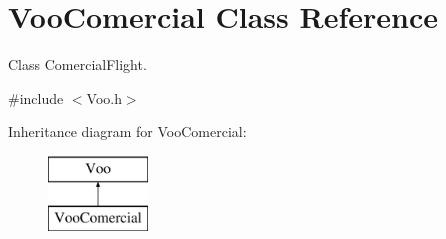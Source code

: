 \hypertarget{class_voo_comercial}{}\section{Voo\+Comercial Class Reference}
\label{class_voo_comercial}


Class Comercial\+Flight.  




{\ttfamily \#include $<$Voo.\+h$>$}

Inheritance diagram for Voo\+Comercial\+:\begin{figure}[H]
\begin{center}
\leavevmode
\includegraphics[height=2.000000cm]{class_voo_comercial}
\end{center}
\end{figure}
